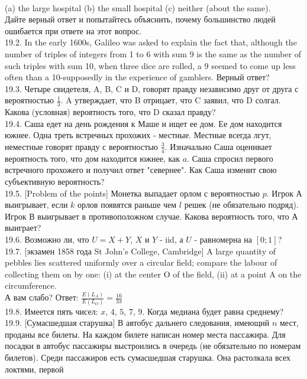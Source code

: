 \documentclass[pdftex,12pt,a4paper]{article}
\begin{document}
\\
(a) the large hospital (b) the small hospital (c) neither (about the same).\\
Дайте верный ответ и попытайтесь объяснить, почему большинство
людей ошибается при ответе на этот вопрос. \\
19.2. In the early 1600s, Galileo was asked to explain the fact
that, although the number of triples of integers from 1 to 6 with
sum 9 is the same as the number of such triples with sum 10, when
three dice are rolled, a 9 seemed to come up less often than a
10-supposedly in the experience of gamblers. Верный ответ? \\
19.3. Четыре свидетеля, A, B, C и D, говорят правду независимо
друг от друга с вероятностью $\frac{1}{3}$. A утверждает, что B
отрицает, что C заявил, что D солгал. Какова (условная)
вероятность того, что D сказал правду? \\
19.4. Саша едет на день рождения к Маше и ищет ее дом. Ее дом
находится южнее. Одна треть встречных прохожих - местные. Местные
всегда лгут, неместные говорят правду с вероятностью
$\frac{3}{4}$. Изначально Саша оценивает вероятность того, что дом
находится южнее, как $a$. Саша спросил первого встречного
прохожего и получил ответ "севернее". Как Саша изменит свою
субъективную вероятность? \\
19.5. [Problem of the points] Монетка выпадает орлом с
вероятностью $p$. Игрок А выигрывает, если $k$ орлов появятся
раньше чем $l$ решек (не обязательно подряд). Игрок В выигрывает в
противоположном случае. Какова вероятность того, что А выиграет?
\\
19.6. Возможно ли, что $U=X+Y$, $X$ и $Y$ - iid, а $U$ -
равномерна на $[0;1]$? \\
19.7. [экзамен 1858 года St John's College, Cambridge] A large
quantity of pebbles lies scattered uniformly over a circular
field; compare the labour of collecting them on by one:
(i) at the center O of the field, (ii) at a point A on the circumference. \\
А вам слабо? Ответ: $\frac{E(L_{A})}{E(L_{O})}=\frac{16}{3\pi}$ \\
19.8. Имеется пять чисел: $x$, $4$, $5$, $7$, $9$. Когда медиана будет равна среднему? \\
19.9. [Сумасшедшая старушка] В автобус дальнего следования,
имеющий $n$ мест, проданы все билеты. На каждом билете написан
номер места пассажира. Для посадки в автобус пассажиры выстроились
в очередь (не обязательно по номерам билетов). Среди пассажиров
есть сумасшедшая старушка. Она растолкала всех локтями, первой
\end{document}
